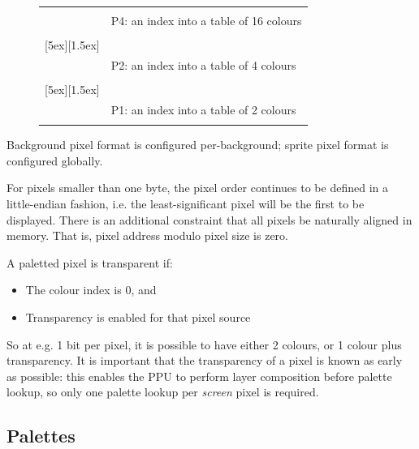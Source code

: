 \documentclass[notitlepage]{article}
\begin{document}
\begin{figure}[!htb]
\begin{tabular}{r l}
{\begin{bytefield}[endianness=big,bitformatting=\small, bitwidth=auto]{4}
		\bitheader{0,3} \\
		\bitbox{4}{Index}
		\end{bytefield}} & P4: an index into a table of 16 colours \\
		\\
	\raisebox{-1ex}[5ex][1.5ex]{
		\begin{bytefield}[endianness=big,bitformatting=\small, bitwidth=auto]{2}
		\bitheader{0,1} \\
		\bitbox{2}{Idx}
		\end{bytefield}} & P2: an index into a table of 4 colours \\
		\\
	\raisebox{-1ex}[5ex][1.5ex]{
		\begin{bytefield}[endianness=big,bitformatting=\small, bitwidth=auto]{1}
		\bitheader{0} \\
		\bitbox{1}{I}
		\end{bytefield}} & P1: an index into a table of 2 colours \\
		\\
\end{tabular}
\end{figure}

Background pixel format is configured per-background; sprite pixel format is configured globally.

For pixels smaller than one byte, the pixel order continues to be defined in a little-endian fashion, i.e. the least-significant pixel will be the first to be displayed. There is an additional constraint that all pixels be naturally aligned in memory. That is, pixel address modulo pixel size is zero.

A paletted pixel is transparent if:

\begin{itemize}
	\item The colour index is 0, and
	\item Transparency is enabled for that pixel source
\end{itemize}

So at e.g. 1 bit per pixel, it is possible to have either 2 colours, or 1 colour plus transparency. It is important that the transparency of a pixel is known as early as possible: this enables the PPU to perform layer composition before palette lookup, so only one palette lookup per \textit{screen} pixel is required.


\subsection{Palettes}
\end{document}
